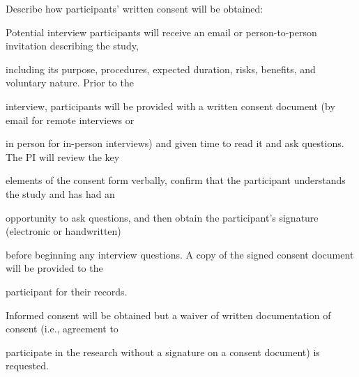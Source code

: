 \documentclass[10pt, letterpaper]{article}
\begin{document}
\begin{responsebox}

Describe how participants' written consent will be obtained:

Potential interview participants will receive an email or person-to-person invitation describing the study,

\vspace{0.5em}

\vspace{0.5em}

\vspace{0.5em}

including its purpose, procedures, expected duration, risks, benefits, and voluntary nature. Prior to the

interview, participants will be provided with a written consent document (by email for remote interviews or

in person for in-person interviews) and given time to read it and ask questions. The PI will review the key

elements of the consent form verbally, confirm that the participant understands the study and has had an

opportunity to ask questions, and then obtain the participant’s signature (electronic or handwritten)

before beginning any interview questions. A copy of the signed consent document will be provided to the

participant for their records.

\vspace{0.5em}

\vspace{0.5em}

\end{responsebox}

\noindent \makebox[0pt][l]{$\square$}\hspace{1.2em} Informed consent will be obtained but a waiver of written documentation of consent (i.e., agreement to

\begin{responsebox}

participate in the research without a signature on a consent document) is requested.

\vspace{0.5em}

\vspace{0.5em}

\end{responsebox}
\end{document}
